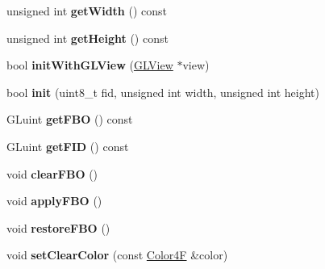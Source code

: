 \begin{DoxyCompactItemize}
unsigned int {\bfseries get\+Width} () const
\item 
\mbox{\label{classexperimental_1_1FrameBuffer_ab43a71b9915ee6be4a8abcf08ab4e515}} 
unsigned int {\bfseries get\+Height} () const
\item 
\mbox{\label{classexperimental_1_1FrameBuffer_adaf3ea1daa37cb8bd1e14e9ba12df444}} 
bool {\bfseries init\+With\+G\+L\+View} (\hyperlink{classGLView}{G\+L\+View} $\ast$view)
\item 
\mbox{\label{classexperimental_1_1FrameBuffer_ae87323f6ff0ee697b2a6ce36ee7afd9d}} 
bool {\bfseries init} (uint8\+\_\+t fid, unsigned int width, unsigned int height)
\item 
\mbox{\label{classexperimental_1_1FrameBuffer_a28aee9760be43b41399db60c8b5c5dd3}} 
G\+Luint {\bfseries get\+F\+BO} () const
\item 
\mbox{\label{classexperimental_1_1FrameBuffer_ad48dcb275981bbf64c5beae7123cd6c0}} 
G\+Luint {\bfseries get\+F\+ID} () const
\item 
\mbox{\label{classexperimental_1_1FrameBuffer_acbe94c3e0e67f0eb61ebf2093f0e8a8b}} 
void {\bfseries clear\+F\+BO} ()
\item 
\mbox{\label{classexperimental_1_1FrameBuffer_a48523e11d0a440736786fbab6b56a5f4}} 
void {\bfseries apply\+F\+BO} ()
\item 
\mbox{\label{classexperimental_1_1FrameBuffer_a11467053450de2da6d4b26104a6a569a}} 
void {\bfseries restore\+F\+BO} ()
\item 
\mbox{\label{classexperimental_1_1FrameBuffer_aa6a6446fabfdd36ebddfd3e9bcf3cd64}} 
void {\bfseries set\+Clear\+Color} (const \hyperlink{structColor4F}{Color4F} \&color)
\item 
\mbox{\label{classexperimental_1_1FrameBuffer_a024e094f5b92170c11495f87eed00ab1}} 

\end{DoxyCompactItemize}

